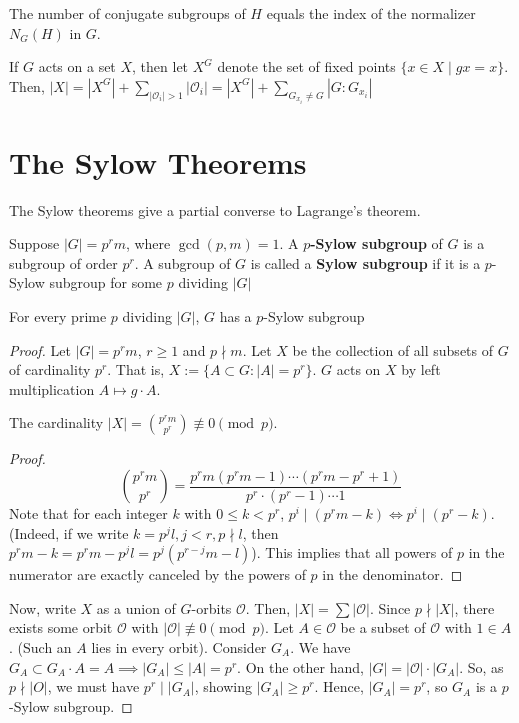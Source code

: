 \begin{cor}
    The number of conjugate subgroups of $H$ equals the index of the normalizer $N_G(H)$ in $G$.
\end{cor}

\begin{notebox*}[Notation]
    If $G$ acts on a set $X$, then let $X^G$ denote the set of fixed points $\{x \in X \mid gx=x\}$. Then, $|X|=|X^G|+\sum_{|\mathcal O_i|>1}|\mathcal O_i|=|X^G|+\sum_{G_{x_i} \neq G} |G:G_{x_i}|$
\end{notebox*}

\section{The Sylow Theorems}
The Sylow theorems give a partial converse to Lagrange's theorem.

\begin{defn}
    Suppose $|G|=p^rm$, where $\gcd(p,m)=1$. A \textbf{$p$-Sylow subgroup} of $G$ is a subgroup of order $p^r$. A subgroup of $G$ is called a \textbf{Sylow subgroup} if it is a $p$-Sylow subgroup for some $p$ dividing $|G|$
\end{defn}

\begin{thm}
    For every prime $p$ dividing $|G|$, $G$ has a $p$-Sylow subgroup
\end{thm}

\begin{proof}
    Let $|G|=p^rm$, $r\geq 1$ and $p \nmid m$. Let $X$ be the collection of all subsets of $G$ of cardinality $p^r$. That is, $X:= \{A \subset G : |A| = p^r\}$. $G$ acts on $X$ by left multiplication $A \mapsto g\cdot A$.

    \begin{lem}
        The cardinality $|X|=\binom{p^r m}{p^r} \not \equiv 0 \pmod p$.
    \end{lem}
    \begin{proof}
        $$\binom{p^r m}{p^r}=\frac{p^rm(p^rm-1)\cdots (p^rm-p^r+1)}{p^r\cdot (p^r-1)\cdots 1}$$
        Note that for each integer $k$ with $0 \leq k < p^r$, $p^i\mid (p^rm-k) \iff p^i \mid (p^r-k)$. (Indeed, if we write $k=p^jl,j<r,p \nmid l$, then $p^rm-k = p^rm-p^jl = p^j(p^{r-j}m-l)$). This implies that all powers of $p$ in the numerator are exactly canceled by the powers of $p$ in the denominator.
    \end{proof}
    Now, write $X$ as a union of $G$-orbits $\mathcal O$. Then, $|X|=\sum|\mathcal O|$. Since $p \nmid |X|$, there exists some orbit $\mathcal O$ with $|\mathcal O| \not \equiv 0 \pmod p$. Let $A \in \mathcal O$ be a subset of $\mathcal O$ with $1 \in A$. (Such an $A$ lies in every orbit). Consider $G_A$. We have $G_A \subset G_A \cdot A=A \implies |G_A| \leq |A| =p^r$. On the other hand, $|G|=|\mathcal O|\cdot |G_A|$. So, as $p \nmid \mathcal |O|$, we must have $p^r \mid |G_A|$, showing $|G_A| \geq p^r$. Hence, $|G_A|= p^r$, so $G_A$ is a $p$-Sylow subgroup.
\end{proof}

